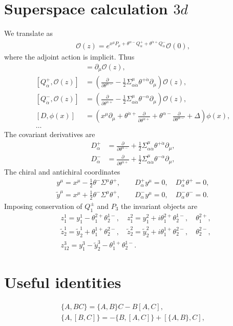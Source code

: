 \documentclass[letterpaper]{article}
\let\Oldsection\section
\renewcommand{\section}{\FloatBarrier\Oldsection}
\def\Om{{\mathcal{O}}}
\def\a{{\alpha}}
\def\ad{{\dot{\alpha}}}
\begin{document}
\section{Superspace calculation \texorpdfstring{$3d$}{3d}}

We translate as
\begin{align}
 \Om(z) = e^{x^\mu P_\mu + \theta^{\a-} Q^+_\a + \theta^{\ad+} Q^-_\ad} \Om(0),
\end{align}
where the adjoint action is implicit. Thus
\begin{align}
 [P_\mu, \Om(z)] & = \partial_\mu \Om(z), \\
 [Q^+_\a, \Om(z)] & = \left( 
     \frac{\partial}{\partial \theta^{\a-}} 
   - \frac{1}{2} \Sigma^\mu_{\a\ad} \theta^{+\ad} \partial_\mu
 \right) \Om(z), \\
 [Q^-_\ad, \Om(z)] & = \left( 
     \frac{\partial}{\partial \theta^{\ad+}} 
   - \frac{1}{2} \Sigma^\mu_{\a\ad} \theta^{-\a} \partial_\mu
 \right) \Om(z), \\
 [D, \phi(x)] & =  \left(
      x^\mu \partial_\mu 
    + \theta^{\ad+} \frac{\partial}{\partial \theta^{\ad+}} 
    + \theta^{\a-}  \frac{\partial}{\partial \theta^{\a-}} 
    + \Delta
  \right) \phi(x), \\
 \ldots
\end{align}
The covariant derivatives are
\begin{align}
   D^+_\a 
 & = \frac{\partial}{\partial \theta^{\a-}} 
   + \frac{1}{2} \Sigma^\mu_{\a\ad} \theta^{+\ad} \partial_\mu, \\
   D^-_\ad
 & = \frac{\partial}{\partial \theta^{\ad+}} 
   + \frac{1}{2} \Sigma^\mu_{\a\ad} \theta^{-\a} \partial_\mu,
\end{align}
The chiral and antichiral coordinates
\begin{align}
 y^\mu = x^\mu - \frac{1}{2} \theta^- \Sigma^\mu \theta^+, \qquad
 D^+_\a y^\mu = 0, \quad
 D^+_\a \theta^+ = 0, \\
 \tilde y^\mu = x^\mu + \frac{1}{2} \theta^- \Sigma^\mu \theta^+, \qquad
 D^-_\a y^\mu = 0, \quad
 D^-_\a \theta^- = 0.
\end{align}
Imposing conservation of $Q_{1}^\pm$ and $P_3$ the invariant objects are
\begin{align}
 & z_1^1 = y_1^1 -   \theta_1^{2+} \theta_2^{1-}, \quad
   z_1^2 = y_1^2 + i \theta_1^{2+} \theta_2^{1-}, \quad
   \theta_1^{2+}, \\[0.5em]
 & \tilde z_2^1 = \tilde y_2^1 +   \theta_1^{1+} \theta_2^{2-}, \quad
   \tilde z_2^2 = \tilde y_2^2 + i \theta_1^{1+} \theta_2^{2-}, \quad
   \theta_2^{2-}, \\[0.5em]
 & z_{12}^3 = y_1^3 - \tilde y_2^3 - \theta_1^{1+} \theta_2^{1-}.
\end{align}



\appendix



\section{Useful identities}

\begin{align}
 \{ A, B C \} = \{ A, B \} C - B [A, C], \\
 \{ A, [B, C] \} = - \{ B, [A, C] \}  + [ \{A, B \}, C], \\
\end{align}
\end{document}
